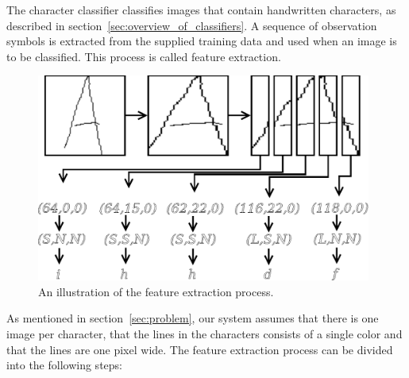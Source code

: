 
The character classifier classifies images that contain handwritten characters, as described in section~\ref{sec:overview_of_classifiers}. 
A sequence of observation symbols is extracted from the supplied training data and used when an image is to be classified. 
This process is called feature extraction. 

    \begin{figure}[htb] 
      \begin{center}
	\leavevmode
	\includegraphics[width=110mm]{image_feature_extraction.pdf}%
      \end{center}
      \caption{An illustration of the feature extraction process.}
      \label{fig:image_feature_extraction}
    \end{figure}


As mentioned in section~\ref{sec:problem}, our system assumes that there is one image per character, that the lines in the characters consists of a single color and that the lines are one pixel wide. The feature extraction process can be divided into the following steps:

